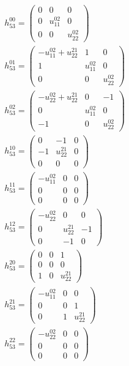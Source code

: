 \documentclass[a4paper, 11pt, twoside, onecolumn]{article}
\begin{document}
\begin{landscape}
\begin{gather*}
	 h_{53}^{00}=\begin{pmatrix}0 & 0 & 0\\0 & u^{02}_{11} & 0\\0 & 0 & u^{02}_{22}\end{pmatrix}\\ 
	 h_{53}^{01}=\begin{pmatrix}- u^{02}_{11} + u^{21}_{22} & 1 & 0\\1 & u^{02}_{11} & 0\\0 & 0 & u^{02}_{22}\end{pmatrix}\\ 
	 h_{53}^{02}=\begin{pmatrix}- u^{02}_{22} + u^{21}_{22} & 0 & -1\\0 & u^{02}_{11} & 0\\-1 & 0 & u^{02}_{22}\end{pmatrix}\\ 
	 h_{53}^{10}=\begin{pmatrix}0 & -1 & 0\\-1 & u^{21}_{22} & 0\\0 & 0 & 0\end{pmatrix}\\ 
	 h_{53}^{11}=\begin{pmatrix}- u^{02}_{11} & 0 & 0\\0 & 0 & 0\\0 & 0 & 0\end{pmatrix}\\ 
	 h_{53}^{12}=\begin{pmatrix}- u^{02}_{22} & 0 & 0\\0 & u^{21}_{22} & -1\\0 & -1 & 0\end{pmatrix}\\ 
	 h_{53}^{20}=\begin{pmatrix}0 & 0 & 1\\0 & 0 & 0\\1 & 0 & u^{21}_{22}\end{pmatrix}\\ 
	 h_{53}^{21}=\begin{pmatrix}- u^{02}_{11} & 0 & 0\\0 & 0 & 1\\0 & 1 & u^{21}_{22}\end{pmatrix}\\ 
	 h_{53}^{22}=\begin{pmatrix}- u^{02}_{22} & 0 & 0\\0 & 0 & 0\\0 & 0 & 0\end{pmatrix}\\ 

\end{gather*}
\end{landscape}
\end{document}
